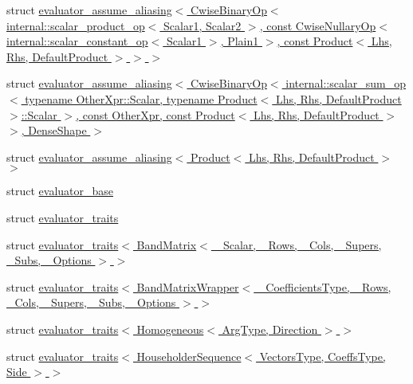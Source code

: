 \begin{DoxyCompactItemize}
\item 
struct \hyperlink{struct_eigen_1_1internal_1_1evaluator__assume__aliasing_3_01_cwise_binary_op_3_01internal_1_1scae866e2c7242096d7b5fd789e3b867e0a}{evaluator\+\_\+assume\+\_\+aliasing$<$ Cwise\+Binary\+Op$<$ internal\+::scalar\+\_\+product\+\_\+op$<$ Scalar1, Scalar2 $>$, const Cwise\+Nullary\+Op$<$ internal\+::scalar\+\_\+constant\+\_\+op$<$ Scalar1 $>$, Plain1 $>$, const Product$<$ Lhs, Rhs, Default\+Product $>$ $>$ $>$}
\item 
struct \hyperlink{struct_eigen_1_1internal_1_1evaluator__assume__aliasing_3_01_cwise_binary_op_3_01internal_1_1scac641579c4e5344f96636c29532d8e354}{evaluator\+\_\+assume\+\_\+aliasing$<$ Cwise\+Binary\+Op$<$ internal\+::scalar\+\_\+sum\+\_\+op$<$ typename Other\+Xpr\+::\+Scalar, typename Product$<$ Lhs, Rhs, Default\+Product $>$\+::\+Scalar $>$, const Other\+Xpr, const Product$<$ Lhs, Rhs, Default\+Product $>$ $>$, Dense\+Shape $>$}
\item 
struct \hyperlink{struct_eigen_1_1internal_1_1evaluator__assume__aliasing_3_01_product_3_01_lhs_00_01_rhs_00_01_default_product_01_4_01_4}{evaluator\+\_\+assume\+\_\+aliasing$<$ Product$<$ Lhs, Rhs, Default\+Product $>$ $>$}
\item 
struct \hyperlink{struct_eigen_1_1internal_1_1evaluator__base}{evaluator\+\_\+base}
\item 
struct \hyperlink{struct_eigen_1_1internal_1_1evaluator__traits}{evaluator\+\_\+traits}
\item 
struct \hyperlink{struct_eigen_1_1internal_1_1evaluator__traits_3_01_band_matrix_3_01___scalar_00_01___rows_00_01_ce5c440dcbb14a96e9ed2eb62b54545a}{evaluator\+\_\+traits$<$ Band\+Matrix$<$ \+\_\+\+Scalar, \+\_\+\+Rows, \+\_\+\+Cols, \+\_\+\+Supers, \+\_\+\+Subs, \+\_\+\+Options $>$ $>$}
\item 
struct \hyperlink{struct_eigen_1_1internal_1_1evaluator__traits_3_01_band_matrix_wrapper_3_01___coefficients_type_cee9d317520cda5230220118c896281a}{evaluator\+\_\+traits$<$ Band\+Matrix\+Wrapper$<$ \+\_\+\+Coefficients\+Type, \+\_\+\+Rows, \+\_\+\+Cols, \+\_\+\+Supers, \+\_\+\+Subs, \+\_\+\+Options $>$ $>$}
\item 
struct \hyperlink{struct_eigen_1_1internal_1_1evaluator__traits_3_01_homogeneous_3_01_arg_type_00_01_direction_01_4_01_4}{evaluator\+\_\+traits$<$ Homogeneous$<$ Arg\+Type, Direction $>$ $>$}
\item 
struct \hyperlink{struct_eigen_1_1internal_1_1evaluator__traits_3_01_householder_sequence_3_01_vectors_type_00_01_5d5adf52607be62fe2f73ff93bacbb36}{evaluator\+\_\+traits$<$ Householder\+Sequence$<$ Vectors\+Type, Coeffs\+Type, Side $>$ $>$}

\end{DoxyCompactItemize}
